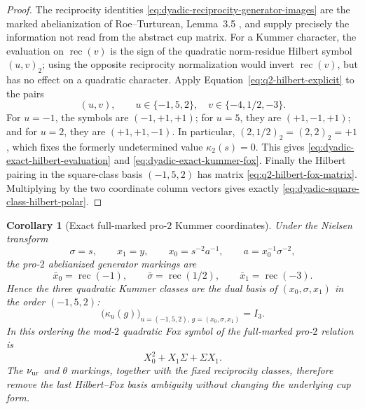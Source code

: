 \documentclass[11pt]{article}
\newtheorem{corollary}[theorem]{Corollary}
\theoremstyle{definition}
\begin{document}
\begin{proof}
The reciprocity identities
\eqref{eq:dyadic-reciprocity-generator-images}
are the marked abelianization of
Roe--Turturean, Lemma~3.5
\cite{RoeTurtureanGQ2}, and supply precisely
the information not read from the abstract cup matrix.
For a Kummer character, the evaluation on
$\operatorname{rec}(v)$ is the sign of the
quadratic norm-residue Hilbert symbol $(u,v)_2$;
using the opposite reciprocity normalization
would invert $\operatorname{rec}(v)$, but has
no effect on a quadratic character.
Apply Equation~\eqref{eq:q2-hilbert-explicit}
to the pairs
\[
 (u,v),\qquad
 u\in\{-1,5,2\},\quad
 v\in\{-4,1/2,-3\}.
\]
For $u=-1$, the symbols are $(-1,+1,+1)$;
for $u=5$, they are $(+1,-1,+1)$;
and for $u=2$, they are $(+1,+1,-1)$.
In particular,
$(2,1/2)_2=(2,2)_2=+1$, which fixes the
formerly undetermined value
$\kappa_2(s)=0$.
This gives \eqref{eq:dyadic-exact-hilbert-evaluation}
and \eqref{eq:dyadic-exact-kummer-fox}.
Finally the Hilbert pairing in the square-class
basis $(-1,5,2)$ has matrix
\eqref{eq:q2-hilbert-fox-matrix}.
Multiplying by the two coordinate column vectors
gives exactly
\eqref{eq:dyadic-square-class-hilbert-polar}.
\end{proof}

\begin{corollary}[Exact full-marked pro-$2$ Kummer coordinates]
\label{cor:dyadic-full-marked-kummer-coordinates}
Under the Nielsen transform
\begin{equation}\label{eq:dyadic-nielsen-full-generator-map}
\sigma=s,\qquad x_1=y,\qquad
x_0=s^{-2}a^{-1},
\qquad
a=x_0^{-1}\sigma^{-2},
\end{equation}
the pro-$2$ abelianized generator markings are
\begin{equation}\label{eq:dyadic-full-pro2-reciprocity}
\bar x_0=\operatorname{rec}(-1),\qquad
\bar\sigma=\operatorname{rec}(1/2),\qquad
\bar x_1=\operatorname{rec}(-3).
\end{equation}
Hence the three quadratic Kummer classes
are the dual basis of $(x_0,\sigma,x_1)$
in the order $(-1,5,2)$:
\begin{equation}\label{eq:dyadic-full-generator-evaluation}
\bigl(\kappa_u(g)\bigr)_{u=(-1,5,2),\,g=(x_0,\sigma,x_1)}
=I_3.
\end{equation}
In this ordering the mod-$2$ quadratic Fox
symbol of the full-marked pro-$2$ relation
is
\[
X_0^2+X_1\Sigma+\Sigma X_1.
\]
The $\nu_{\rm ur}$ and $\theta$ markings,
together with the fixed reciprocity classes,
therefore remove the last Hilbert--Fox
basis ambiguity without changing the
underlying cup form.
\end{corollary}
\end{document}

